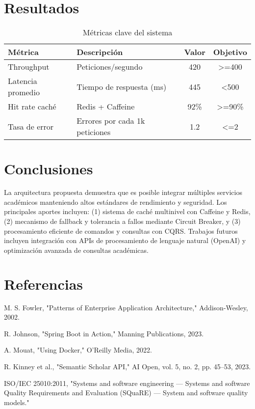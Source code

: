 \documentclass[10pt,journal]{IEEEtran}
\begin{document}
\section{Resultados}
\begin{table}[htbp]
  \caption{Métricas clave del sistema}
  \label{tab:metrics}
  \centering
  \begin{tabularx}{\columnwidth}{|l|X|c|c|}
    \hline
    \textbf{Métrica}       & \textbf{Descripción}           & \textbf{Valor} & \textbf{Objetivo} \\
    \hline
    Throughput            & Peticiones/segundo             & 420            & \textgreater=400    \\
    \hline
    Latencia promedio     & Tiempo de respuesta (ms)       & 445            & \textless500       \\
    \hline
    Hit rate caché        & Redis + Caffeine               & 92\%          & \textgreater=90\%  \\
    \hline
    Tasa de error         & Errores por cada 1k peticiones & 1.2            & \textless=2        \\
    \hline
  \end{tabularx}
\end{table}

\section{Conclusiones}
La arquitectura propuesta demuestra que es posible integrar múltiples servicios académicos manteniendo altos estándares de rendimiento y seguridad. Los principales aportes incluyen: (1) sistema de caché multinivel con Caffeine y Redis, (2) mecanismo de fallback y tolerancia a fallos mediante Circuit Breaker, y (3) procesamiento eficiente de comandos y consultas con CQRS. Trabajos futuros incluyen integración con APIs de procesamiento de lenguaje natural (OpenAI) y optimización avanzada de consultas académicas.

\section*{Referencias}
\begin{thebibliography}{9}
M. S. Fowler, "Patterns of Enterprise Application Architecture," Addison-Wesley, 2002.

R. Johnson, "Spring Boot in Action," Manning Publications, 2023.

A. Mouat, "Using Docker," O'Reilly Media, 2022.

R. Kinney et al., "Semantic Scholar API," AI Open, vol. 5, no. 2, pp. 45--53, 2023.

ISO/IEC 25010:2011, "Systems and software engineering — Systems and software Quality Requirements and Evaluation (SQuaRE) — System and software quality models."
\end{thebibliography}
\end{document}
